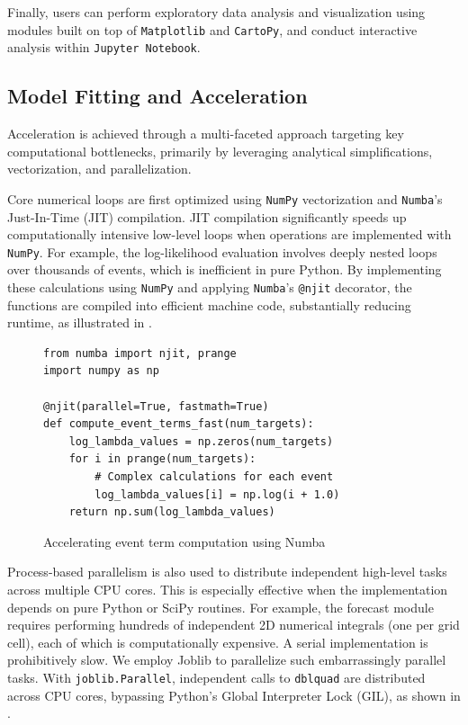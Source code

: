 \documentclass[extra,mreferee]{gji}
\theoremstyle{lemma}
\begin{document}
Finally, users can perform exploratory data analysis and visualization using modules built on top of \texttt{Matplotlib} and \texttt{CartoPy}, and conduct interactive analysis within \texttt{Jupyter Notebook}.



\subsection{Model Fitting and Acceleration}

Acceleration is achieved through a multi-faceted approach targeting key computational bottlenecks, primarily by leveraging analytical simplifications, vectorization, and parallelization.

Core numerical loops are first optimized using \texttt{NumPy} vectorization and \texttt{Numba}’s Just-In-Time (JIT) compilation. JIT compilation significantly speeds up computationally intensive low-level loops when operations are implemented with \texttt{NumPy}. For example, the log-likelihood evaluation involves deeply nested loops over thousands of events, which is inefficient in pure Python. By implementing these calculations using \texttt{NumPy} and applying \texttt{Numba}’s \texttt{@njit} decorator, the functions are compiled into efficient machine code, substantially reducing runtime, as illustrated in .


\begin{figure}
\begin{lstlisting}[style=mypython]
from numba import njit, prange
import numpy as np

@njit(parallel=True, fastmath=True)
def compute_event_terms_fast(num_targets):
    log_lambda_values = np.zeros(num_targets)
    for i in prange(num_targets):
        # Complex calculations for each event
        log_lambda_values[i] = np.log(i + 1.0)
    return np.sum(log_lambda_values)
\end{lstlisting}
\caption{Accelerating event term computation using Numba}
\label{lst:numba}
\end{figure}

Process-based parallelism is also used to distribute independent high-level tasks across multiple CPU cores. This is especially effective when the implementation depends on pure Python or SciPy routines. For example, the forecast module requires performing hundreds of independent 2D numerical integrals (one per grid cell), each of which is computationally expensive. A serial implementation is prohibitively slow. We employ Joblib to parallelize such embarrassingly parallel tasks. With \texttt{joblib.Parallel}, independent calls to \texttt{dblquad} are distributed across CPU cores, bypassing Python’s Global Interpreter Lock (GIL), as shown in .
\end{document}
